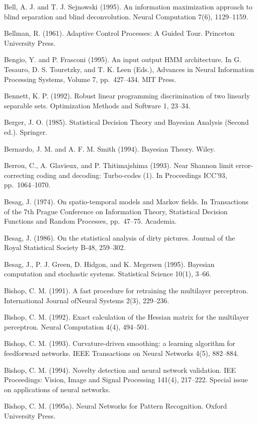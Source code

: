 \documentclass[
  10
]{article}
\begin{document}
Bell, A. J. and T. J. Sejnowski (1995). An information maximization
approach to blind separation and blind deconvolution. Neural Computation
7(6), 1129--1159.

Bellman, R. (1961). Adaptive Control Processes: A Guided Tour. Princeton
University Press.

Bengio, Y. and P. Frasconi (1995). An input output HMM architecture. In
G. Tesauro, D. S. Touretzky, and T. K. Leen (Eds.), Advances in Neural
Information Processing Systems, Volume 7, pp.~427--434. MIT Press.

Bennett, K. P. (1992). Robust linear programming discrimination of two
linearly separable sets. Optimization Methods and Software 1, 23--34.

Berger, J. O. (1985). Statistical Decision Theory and Bayesian Analysis
(Second ed.). Springer.

Bernardo, J. M. and A. F. M. Smith (1994). Bayesian Theory. Wiley.

Berrou, C., A. Glavieux, and P. Thitimajshima (1993). Near Shannon limit
error-correcting coding and decoding: Turbo-codes (1). In Proceedings
ICC'93, pp.~1064--1070.

Besag, J. (1974). On spatio-temporal models and Markov fields. In
Transactions of the 7th Prague Conference on Information Theory,
Statistical Decision Functions and Random Processes, pp.~47--75.
Academia.

Besag, J. (1986). On the statistical analysis of dirty pictures. Journal
of the Royal Statistical Society B-48, 259--302.

Besag, J., P. J. Green, D. Hidgon, and K. Megersen (1995). Bayesian
computation and stochastic systems. Statistical Science 10(1), 3--66.

Bishop, C. M. (1991). A fast procedure for retraining the multilayer
perceptron. International Journal ofNeural Systems 2(3), 229--236.

Bishop, C. M. (1992). Exact calculation of the Hessian matrix for the
multilayer perceptron. Neural Computation 4(4), 494--501.

Bishop, C. M. (1993). Curvature-driven smoothing: a learning algorithm
for feedforward networks. IEEE Transactions on Neural Networks 4(5),
882--884.

Bishop, C. M. (1994). Novelty detection and neural network validation.
IEE Proceedings: Vision, Image and Signal Processing 141(4), 217--222.
Special issue on applications of neural networks.

Bishop, C. M. (1995a). Neural Networks for Pattern Recognition. Oxford
University Press.
\end{document}
